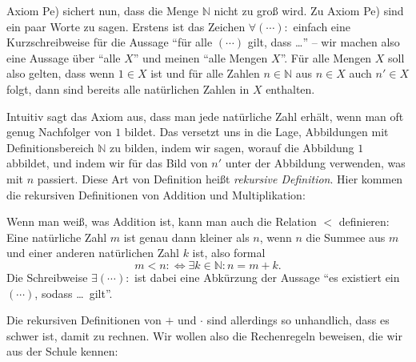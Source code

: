 \documentclass{zusammenfassung}
\begin{document}
Axiom Pe) sichert nun, dass die Menge $\mathbb N$ nicht zu groß wird. Zu Axiom Pe) sind ein paar Worte zu sagen. Erstens ist
das Zeichen $\forall(\cdots):$ einfach eine Kurzschreibweise für die Aussage "`für alle $(\cdots)$ gilt, dass \ldots"' -- wir
machen also eine Aussage über "`alle $X$"' und meinen "`alle Mengen $X$"'. Für alle Mengen $X$ soll also gelten, dass wenn $1\in
X$ ist und für alle Zahlen $n\in\mathbb N$ aus $n\in X$ auch $n'\in X$ folgt, dann sind bereits alle natürlichen Zahlen in $X$
enthalten.

Intuitiv sagt das Axiom aus, dass man jede natürliche Zahl erhält, wenn man oft genug Nachfolger von $1$ bildet. Das versetzt uns
in die Lage, Abbildungen mit Definitionsbereich $\mathbb N$ zu bilden, indem wir sagen, worauf die Abbildung $1$ abbildet, und
indem wir für das Bild von $n'$ unter der Abbildung verwenden, was mit $n$ passiert. Diese Art von Definition heißt
\emph{rekursive Definition}. Hier kommen die rekursiven Definitionen von Addition und Multiplikation:


Wenn man weiß, was Addition ist, kann man auch die Relation $<$ definieren: Eine natürliche Zahl $m$ ist genau dann kleiner als
$n$, wenn $n$ die Summee aus $m$ und einer anderen natürlichen Zahl $k$ ist, also formal
\[
	m<n:\Leftrightarrow\exists k\in\mathbb N:n=m+k.
\]
Die Schreibweise $\exists(\cdots):$ ist dabei eine Abkürzung der Aussage "`es existiert ein $(\cdots)$, sodass \ldots\ gilt"'.

Die rekursiven Definitionen von $+$ und $\cdot$ sind allerdings so unhandlich, dass es schwer ist, damit zu rechnen. Wir wollen
also die Rechenregeln beweisen, die wir aus der Schule kennen:

\end{document}

